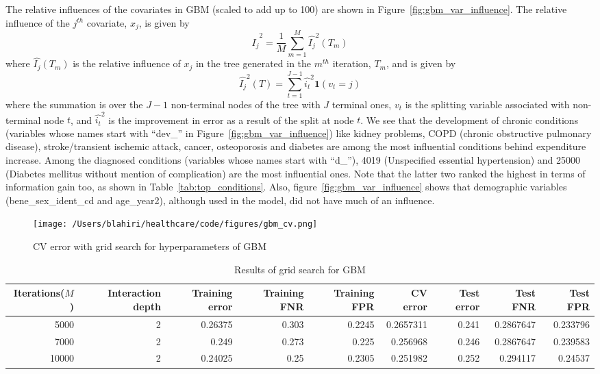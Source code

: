 The relative influences of the covariates in GBM (scaled to add up to 100) are shown in Figure~\ref{fig:gbm_var_influence}. The relative influence of the $j^{th}$ covariate, $x_j$, is given by 
\begin{equation}
\label{eqn:rel_inf_j}
{\hat{I_j}}^2 = \frac{1}{M}\sum_{m=1}^M{{\hat{I_j}}^2(T_m)}
\end{equation}
where $\hat{I_j}(T_m)$ is the relative influence of $x_j$ in the tree generated in the $m^{th}$ iteration, $T_m$, and is given by 
\begin{equation}
\label{eqn:rel_inf_j_T}
{\hat{I_j}}^2(T) = \sum_{t=1}^{J-1}{{\hat{i_t}}^2\mathbf{1}(v_t = j)}
\end{equation}
where the summation is over the $J-1$ non-terminal nodes of the tree with $J$ terminal ones, $v_t$ is the splitting variable associated with non-terminal node $t$, and ${\hat{i_t}}^2$ is the improvement in error as a result of the split at node $t$. We see that the development of chronic conditions (variables whose names start with ``dev\_'' in Figure~\ref{fig:gbm_var_influence}) like kidney problems, COPD (chronic obstructive pulmonary disease), stroke/transient ischemic attack, cancer, osteoporosis and diabetes are among the most influential conditions behind expenditure increase. Among the diagnosed conditions (variables whose names start with ``d\_''), 4019 (Unspecified essential hypertension) and 25000 (Diabetes mellitus without mention of complication) are the most influential ones. Note that the latter two ranked the highest in terms of information gain too, as shown in Table~\ref{tab:top_conditions}. Also, figure~\ref{fig:gbm_var_influence} shows that demographic variables (bene\_sex\_ident\_cd and age\_year2), although used in the model, did not have much of an influence. 

\begin{figure}[!h]
    \centering
    \texttt{[image: /Users/blahiri/healthcare/code/figures/gbm\_cv.png]}
    \caption{\small CV error with grid search for hyperparameters of GBM}
    \label{fig:gbm_cv}
\end{figure}

\begin{table*}[!h]
\centering
\caption{Results of grid search for GBM}
\begin{tabular}{rrrrrrrrr}
\hline
Iterations($M$) & Interaction depth & Training error & Training FNR & Training FPR & CV error & Test error & Test FNR & Test FPR\\
\hline
5000 & 2 & 0.26375 & 0.303 & 0.2245 & 0.2657311 & 0.241 & 0.2867647 & 0.233796\\
7000 & 2 & 0.249 & 0.273 & 0.225 & 0.256968 & 0.246 & 0.2867647 & 0.239583\\
10000 & 2 & 0.24025 & 0.25 & 0.2305 & 0.251982 & 0.252 & 0.294117 & 0.24537\\
\hline
\end{tabular}
\label{tab:gbm_cv}
\end{table*}

